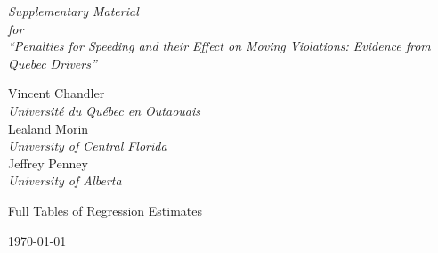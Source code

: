 \phantom{0}
\vspace{1.0in}


\begin{centering}

{\huge \it
Supplementary Material  \\
\vspace{0.5in}
for \\
\vspace{0.5in}
``Penalties for Speeding and their Effect on Moving Violations: Evidence from Quebec Drivers'' \\
}

\vspace{1.0in}


{\large 
Vincent Chandler \\
{\it Universit\'{e} du Qu\'{e}bec en Outaouais} \\
\bigskip
Lealand Morin \\
{\it University of Central Florida} \\
\bigskip
Jeffrey Penney \\
{\it University of Alberta} \\
}

\vspace{1.0in}

{\huge
Full Tables of Regression Estimates
}

\vspace{1.0in}



\today

\end{centering}

\pagebreak
